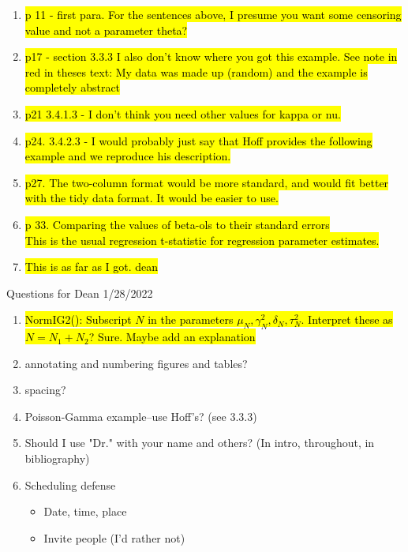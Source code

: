 \documentclass[12pt, a4paper]{article}
\begin{document}
\begin{enumerate}
  \item \hl{p 11 - first para.  For the sentences above, I presume you want some censoring value and not a parameter theta?}
  \item \hl{p17 - section 3.3.3  I also don't know where you got this example. See note in red in theses text:  My data was made up (random) and the example is completely abstract}
  \item \hl{p21 3.4.1.3 - I don't think you need other values for kappa or nu.}
  \item \hl{p24. 3.4.2.3 - I would probably just say that Hoff provides the following example and we reproduce his description.}
  \item \hl{p27. The two-column format would be more standard, and would fit better with the tidy data format.  It would be easier to use.}
  \item \hl{p 33.  Comparing the values of beta-ols to their standard errors}\\
    \hl{This is the usual regression t-statistic for regression parameter estimates.}
  \item \hl{This is as far as I got.  dean}

\end{enumerate}

{\huge Questions for Dean 1/28/2022}
\begin{enumerate}
  \item \hl{NormIG2():  Subscript $N$ in the parameters $\mu_N,\gamma^2_N,\delta_N,\tau^2_N$. Interpret these as $N = N_1 + N_2$?  Sure.  Maybe add an explanation}
  \item annotating and numbering figures and tables?
  \item spacing?
  \item Poisson-Gamma example--use Hoff's? (see 3.3.3)
  \item Should I use "Dr." with  your name and others? (In intro, throughout, in bibliography)
  \item Scheduling defense
  \begin{itemize}
    \item Date, time, place
    \item Invite people (I'd rather not)
  \end{itemize}
\end{enumerate}
\end{document}

